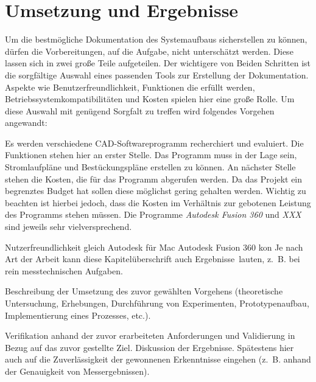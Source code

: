 \chapter{Umsetzung und Ergebnisse}
\label{cha:umsetzung}
Um die bestmögliche Dokumentation des Systemaufbaus sicherstellen zu können, dürfen die Vorbereitungen, auf die Aufgabe, nicht unterschätzt werden. Diese lassen sich in zwei große Teile aufgeteilen. Der wichtigere von Beiden Schritten ist die sorgfältige Auswahl eines passenden Tools zur Erstellung der Dokumentation. Aspekte wie Benutzerfreundlichkeit, Funktionen die erfüllt werden, Betriebssystemkompatibilitäten und Kosten spielen hier eine große Rolle. Um diese Auswahl mit genügend Sorgfalt zu treffen wird folgendes Vorgehen angewandt:

Es werden verschiedene CAD-Softwareprogramm recherchiert und evaluiert. Die Funktionen stehen hier an erster Stelle. Das Programm muss in der Lage sein, Stromlaufpläne und Bestückungspläne erstellen zu können. An nächster Stelle stehen die Kosten, die für das Programm abgerufen werden. Da das Projekt ein begrenztes Budget hat sollen diese möglichst gering gehalten werden. Wichtig zu beachten ist hierbei jedoch, dass die Kosten im Verhältnis zur gebotenen Leistung des Programms stehen müssen. Die Programme \textit{Autodesk Fusion 360} und \textit{XXX} sind jeweils sehr vielversprechend. 

Nutzerfreundlichkeit gleich
Autodesk für Mac
 Autodesk Fusion 360 kon 
Je nach Art der Arbeit kann diese Kapitelüberschrift auch \glqq Ergebnisse\grqq~lauten, z.~B. bei rein messtechnischen Aufgaben.

Beschreibung der Umsetzung des zuvor gewählten Vorgehens (theoretische Untersuchung, Erhebungen, Durchführung von Experimenten, Prototypenaufbau, Implementierung eines Prozesses, etc.).

Verifikation anhand der zuvor erarbeiteten Anforderungen und Validierung in Bezug auf das zuvor gestellte Ziel. Diskussion der Ergebnisse. Spätestens hier auch auf die Zuverlässigkeit der gewonnenen Erkenntnisse eingehen (z.~B. anhand der Genauigkeit von Messergebnissen).

%

%

%

